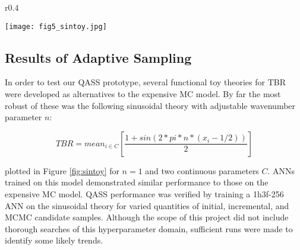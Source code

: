 \newpage

\begin{wrapfigure}{r}{0.4\textwidth}
  \vspace{-60pt}
  \begin{center}
    \texttt{[image: fig5\_sintoy.jpg]}
	\caption{Sinusoidal toy TBR theory over two continuous parameters, wavenumber 1}
    \label{fig:sintoy}
  \end{center}
  \vspace{-30pt}
\end{wrapfigure}

\subsection{Results of Adaptive Sampling}
\label{sec:adaptiveres}

In order to test our QASS prototype, several functional toy theories for TBR were developed as alternatives to the expensive MC model. By far the most robust of these was the following sinusoidal theory with adjustable wavenumber parameter $n$:

\begin{equation}
    TBR = mean_{i \in C} \left[ \frac{1 + sin(2*pi*n*(x_i - 1/2)) }{2} \right]
\end{equation}

plotted in Figure \ref{fig:sintoy} for $n=1$ and two continuous parameters $C$. ANNs trained on this model demonstrated similar performance to those on the expensive MC model. QASS performance was verified by training a 1h3f-256 ANN on the sinusoidal theory for varied quantities of initial, incremental, and MCMC candidate samples. Although the scope of this project did not include thorough searches of this hyperparameter domain, sufficient runs were made to identify some likely trends.

